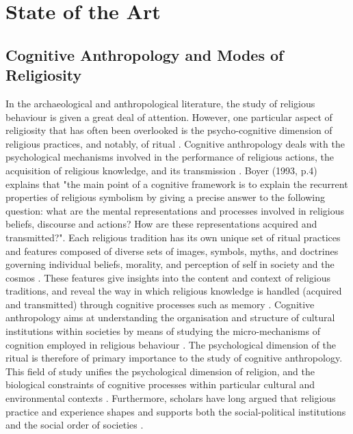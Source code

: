 \documentclass[12pt]{report}
\begin{document}
	
	\chapter{State of the Art}
	\section{Cognitive Anthropology and Modes of Religiosity}
	
	In the archaeological and anthropological literature, the study of religious behaviour is given a great deal of attention. However, one particular aspect of religiosity that has often been overlooked is the psycho-cognitive dimension of religious practices, and notably, of ritual \cite{whitehouse1992}\cite{boyer1993cognitive}. Cognitive anthropology deals with the psychological mechanisms involved in the performance of religious actions, the acquisition of religious knowledge, and its transmission  \cite{boyer2023naturalness}\cite{boyer2007religion}\cite{whitehouse1992}\cite{whitehouse2001}. Boyer (1993, p.4) explains that "the main point of a cognitive framework is to explain the recurrent properties of religious symbolism by giving a precise answer to the following question: what are the mental representations and processes involved in religious beliefs, discourse and actions? How are these representations acquired and transmitted?". Each religious tradition has its own unique set of ritual practices and features composed of diverse sets of images, symbols, myths, and doctrines governing individual beliefs, morality, and perception of self in society and the cosmos \cite{graf1985}\cite{fischer1973cartography}\cite{walsh2005higher}\cite{griffiths2006}\cite{lukoff1990}\cite{sperber2004}. These features give insights into the content and context of religious traditions, and reveal the way in which religious knowledge is handled (acquired and transmitted) through cognitive processes such as memory \cite{whitehouse2001}. Cognitive anthropology aims at understanding the organisation and structure of cultural institutions within societies by means of studying the micro-mechanisms of cognition employed in religious behaviour \cite{boyer1993cognitive}\cite{irons2001religion}\cite{barth1990}\cite{boyer2023naturalness}\cite{sosis2003signaling}\cite{sosis2007scars}\cite{whitehouse2007}\cite{whitehouse2005}\cite{lienard2006}\cite{lawson1990}. The psychological dimension of the ritual is therefore of primary importance to the study of cognitive anthropology. This field of study unifies the psychological dimension of religion, and the biological constraints of cognitive processes within particular cultural and environmental contexts \cite{sosis2003signaling}\cite{sosis2007scars}\cite{mccauley2002}\cite{littlewood2005}\cite{turner1974}\cite{whitehouse1992}\cite{whitehouse2000}. Furthermore, scholars have long argued that religious practice and experience shapes and supports both the social-political institutions and the social order of societies \cite{boyer1993cognitive}\cite{boyer2023naturalness}\cite{hirschfeld1994}\cite{rappaport1999}\cite{sperber1996}\cite{sperber2004}\cite{turner1995}\cite{whitehouse2012}\cite{whitehouse2002}\cite{whitehouse2004modes}.\\
\end{document}
